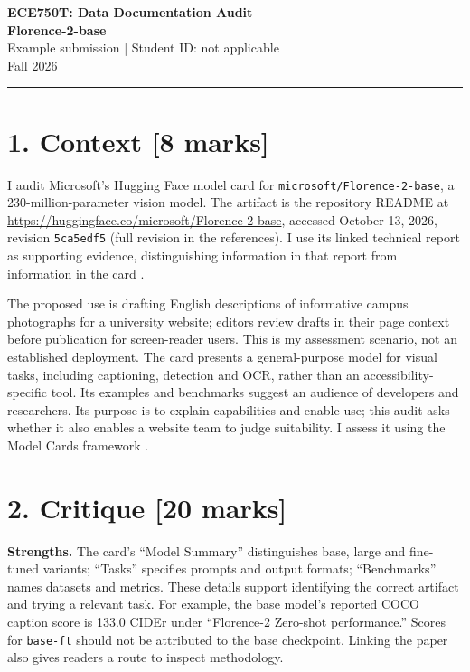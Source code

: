 \documentclass[11pt,letterpaper]{article}
\begin{document}
{\Large\textbf{ECE750T: Data Documentation Audit}}\\[5pt]
{\large\textbf{Florence-2-base}}\\[4pt]
Example submission \quad | \quad Student ID: not applicable\\
Fall 2026
\vspace{0.5em}\hrule\vspace{0.5em}

\section*{1. Context [8 marks]}
I audit Microsoft's Hugging Face model card for \texttt{microsoft/Florence-2-base}, a 230-million-parameter vision model. The artifact is the repository README at \url{https://huggingface.co/microsoft/Florence-2-base}, accessed October 13, 2026, revision \texttt{5ca5edf5} (full revision in the references). I use its linked technical report as supporting evidence, distinguishing information in that report from information in the card \citep{microsoftCard,xiao2023}.

The proposed use is drafting English descriptions of informative campus photographs for a university website; editors review drafts in their page context before publication for screen-reader users. This is my assessment scenario, not an established deployment. The card presents a general-purpose model for visual tasks, including captioning, detection and OCR, rather than an accessibility-specific tool. Its examples and benchmarks suggest an audience of developers and researchers. Its purpose is to explain capabilities and enable use; this audit asks whether it also enables a website team to judge suitability. I assess it using the Model Cards framework \citep{mitchell2019}.

\section*{2. Critique [20 marks]}
\textbf{Strengths.} The card's ``Model Summary'' distinguishes base, large and fine-tuned variants; ``Tasks'' specifies prompts and output formats; ``Benchmarks'' names datasets and metrics. These details support identifying the correct artifact and trying a relevant task. For example, the base model's reported COCO caption score is 133.0 CIDEr under ``Florence-2 Zero-shot performance.'' Scores for \texttt{base-ft} should not be attributed to the base checkpoint. Linking the paper also gives readers a route to inspect methodology.
\end{document}
